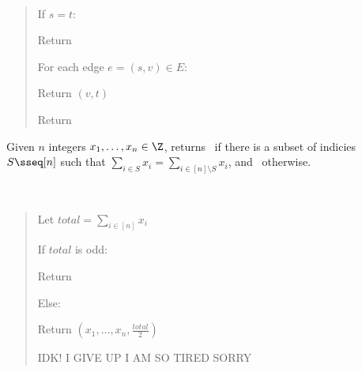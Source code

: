 \documentclass[10pt]{article}
\begin{document}
\begin{solution}\ %
\begin{quote}%
\noindent{}%

%

\begin{steps}
  \item If $s = t$:
    \begin{steps}
    \item Return \boolT~
    \end{steps}
  \end{steps}
  \begin{steps}
  \setcounter{stepsi}{1}
  \item For each edge $e = (s, v) \in E$:
    \begin{steps}
    \item Return $(v, t)$
    \end{steps}
  \item Return \boolF~
\end{steps}

\end{quote}%
\end{solution}%
\pagebreak

Given $ n $ integers $ x_1,\ldots,x_n\in\Z $, returns \boolT~if there is a subset of indicies $ S\sseq [n] $ such that $ \sum_{i\in S}x_i = \sum_{i\in[n]\setminus S} x_i $, and \boolF~otherwise.

\begin{solution}\ %
\begin{quote}%
\noindent{}%

%

\begin{steps}
  \item Let $ total = \sum_{i\in [n]} x_i $
  \item If $ total $ is odd:
    \begin{steps}
    \item Return \boolF
    \end{steps}
  \item Else: 
    \begin{steps}
    \item Return $(x_1,\ldots,x_n, \frac{total}{2})$
    \end{steps}

  \item IDK! I GIVE UP I AM SO TIRED SORRY
\end{steps}

\end{quote}%
\end{solution}%
\end{document}

